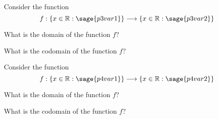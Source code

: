 \documentclass{ximeraXloud}
\begin{document}
\begin{problem}
    Consider the function 
    \[
        f:\{ x \in \mathbb{R} : \sage{p3var1} \} \longrightarrow \{ x \in \mathbb{R} : \sage{p3var2} \}
    \]
    
    What is the domain of the function $f$?
    \begin{multipleChoice}
    \end{multipleChoice}
    
    What is the codomain of the function $f$?
    
    \begin{multipleChoice}
    \end{multipleChoice}
    
\end{problem}


\begin{problem}
    Consider the function 
    \[
        f:\{ x \in \mathbb{R} : \sage{p4var1} \} \longrightarrow \{ x \in \mathbb{R} : \sage{p4var2} \}
    \]
    
    What is the domain of the function $f$?
    \begin{multipleChoice}
    \end{multipleChoice}
    
    What is the codomain of the function $f$?
    
    \begin{multipleChoice}
    \end{multipleChoice}
    
\end{problem}
\end{document}
